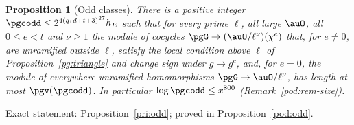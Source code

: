 \documentclass[10pt]{amsart}
\newtheorem{proposition}[theorem]{Proposition}
\theoremstyle{definition}
\theoremstyle{remark}
\begin{document}
\begin{proposition}[Odd classes]\label{pg:odd}
There is a positive integer $\pgcodd\le2^{4(q_1d+t+3)^{27}}h_E$ such that for every prime $\ell$,
all large $\auO$, all $0\le e<t$ and $\nu\ge1$ the module of cocycles $\pgG\to(\auO/\ell^\nu)(
\chi^e)$ that, for $e\ne0$, are unramified outside $\ell$, satisfy the local condition above $\ell$ of
Proposition~\ref{pg:triangle} and change sign under $g\mapsto g^c$, and, for $e=0$, the module of
everywhere unramified homomorphisms $\pgG\to\auO/\ell^\nu$, has length at
most $\pgv(\pgcodd)$. In particular $\log\pgcodd\le x^{800}$ (Remark~\ref{pod:rem-size}).
\end{proposition}
\smallskip\noindent Exact statement: Proposition~\ref{pri:odd}; proved in Proposition~\ref{pod:odd}.\par\smallskip
\end{document}
